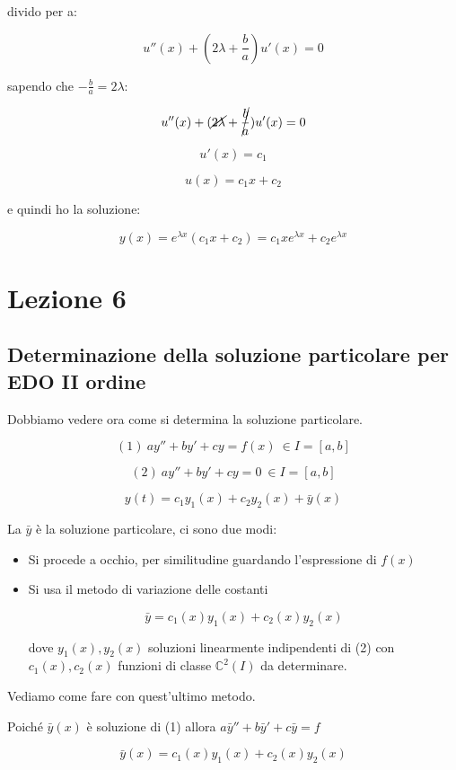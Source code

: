 \documentclass[11pt]{article}
\begin{document}
divido per a:

\[
 u''(x) + (2 \lambda + \frac{b}{a})u'(x) = 0
\]

sapendo che $-\frac{b}{a} = 2 \lambda$:

\[
 u''(x) + (\cancel{2 \lambda} + \cancel{\frac{b}{a}})u'(x) = 0
\]


\[
    u'(x) = c_1
\]

\[
    u(x) = c_1 x +c_2
\]

e quindi ho la soluzione:

\[
    y(x) = e ^{\lambda x}(c_1x+c_2) = c_1x e^{\lambda x}+ c_2 e ^{\lambda x}
\]

\newpage

\section{Lezione 6}

\subsection{Determinazione della soluzione particolare per EDO II ordine}


Dobbiamo vedere ora come si determina la soluzione particolare.

\[
    (1)\ ay''+by'+cy = f(x)\ \in I=[a,b]
\]

\[
    (2)\ ay''+by'+cy = 0\ \in I=[a,b]
\]

\[
    y(t) = c_1 y_1(x) + c_2 y_2(x) + \bar{y} (x)
\]

La $\bar{y}$ è la soluzione particolare, ci sono due modi:

\begin{itemize}
    \item Si procede a occhio, per similitudine guardando l'espressione di $f(x)$
    \item Si usa il metodo di variazione delle costanti

        \[
            \bar{y} = c_1(x) y_1(x) + c_2(x) y_2(x)
        \]

        dove ${y_1(x),y_2(x)}$ soluzioni linearmente indipendenti di (2) con $c_1(x),c_2(x)$ funzioni di classe $\mathbb{C}^{2}(I)$ da determinare.
\end{itemize}

Vediamo come fare con quest'ultimo metodo.

Poiché $\bar{y} (x)$ è soluzione di (1) allora  $a\bar{y} ''+b \bar{y}'+c\bar{y}=f$

\[
    \bar{y} (x) = c_1(x) y_1(x) + c_2(x) y_2(x)
\]
\end{document}
